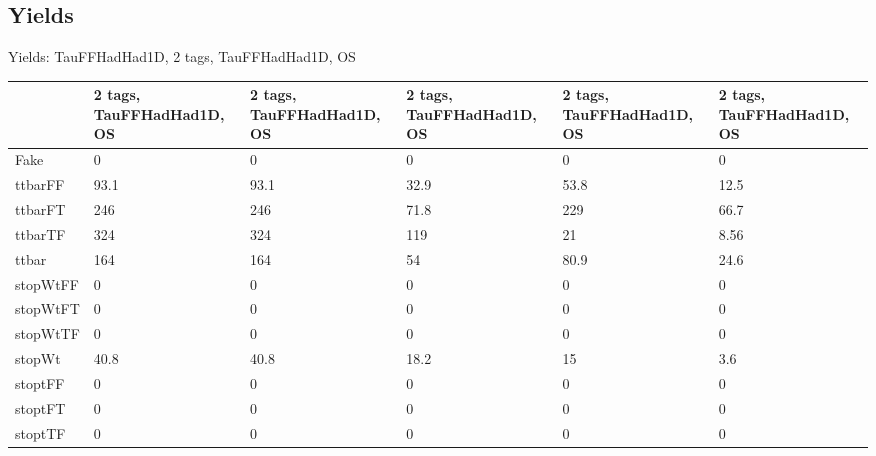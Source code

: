 
\subsection{Yields}

\begin{frame}{Yields: TauFFHadHad1D, 2 tags, TauFFHadHad1D, OS}
\begin{center}
  \begin{tabular}{l| >{\centering\let\newline\\\arraybackslash\hspace{0pt}}m{1.4cm}| >{\centering\let\newline\\\arraybackslash\hspace{0pt}}m{1.4cm}| >{\centering\let\newline\\\arraybackslash\hspace{0pt}}m{1.4cm}| >{\centering\let\newline\\\arraybackslash\hspace{0pt}}m{1.4cm}| >{\centering\let\newline\\\arraybackslash\hspace{0pt}}m{1.4cm}}
    & 2 tags, TauFFHadHad1D, OS & 2 tags, TauFFHadHad1D, OS & 2 tags, TauFFHadHad1D, OS & 2 tags, TauFFHadHad1D, OS & 2 tags, TauFFHadHad1D, OS \\
 \hline \hline
    Fake& 0 & 0 & 0 & 0 & 0 \\
 \hline
    ttbarFF& 93.1 & 93.1 & 32.9 & 53.8 & 12.5 \\
 \hline
    ttbarFT& 246 & 246 & 71.8 & 229 & 66.7 \\
 \hline
    ttbarTF& 324 & 324 & 119 & 21 & 8.56 \\
 \hline
    ttbar& 164 & 164 & 54 & 80.9 & 24.6 \\
 \hline
    stopWtFF& 0 & 0 & 0 & 0 & 0 \\
 \hline
    stopWtFT& 0 & 0 & 0 & 0 & 0 \\
 \hline
    stopWtTF& 0 & 0 & 0 & 0 & 0 \\
 \hline
    stopWt& 40.8 & 40.8 & 18.2 & 15 & 3.6 \\
 \hline
    stoptFF& 0 & 0 & 0 & 0 & 0 \\
 \hline
    stoptFT& 0 & 0 & 0 & 0 & 0 \\
 \hline
    stoptTF& 0 & 0 & 0 & 0 & 0 \\
 \hline

\end{tabular}
\end{center}
\end{frame}
